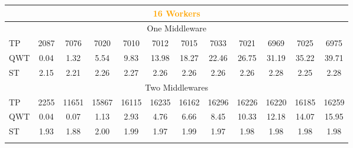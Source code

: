 \documentclass[11pt,a4paper]{article}
\let\tb\textbf
\begin{document}
\begin{table}[H]
\begin{center}
{{\begin{tabular}{|l||c|c|c|c|c|c|c|c|c|c|c|}
        \multicolumn{12}{|c|}{\textcolor{Orange}{\tb{16 Workers}}}        \\ \hline
        \multicolumn{12}{|c|}{One Middleware} \\ \hline
        TP       &      2087   &     7076 &       7020   &     7010  &      7012  &      7015    &    7033    &    7021     &   6969    &    7025    &    6975 \\ \hline
        QWT       &     0.04     &   1.32    &    5.54     &   9.83    &   13.98     &  18.27     &  22.46     &  26.75   &    31.19    &   35.22     &  39.71 \\ \hline
        ST       &      2.15   &     2.21   &     2.26   &     2.27   &     2.26    &    2.26   &     2.26     &   2.26    &    2.28    &    2.25   &     2.28 \\ \hline
        \multicolumn{12}{|c|}{Two Middlewares} \\ \hline
        TP       &      2255    &   11651    &   15867    &   16115  &     16235   &    16162  &     16296  &     16226   &    16220    &   16185    &   16259 \\ \hline
        QWT      &      0.04    &    0.07    &    1.13    &    2.93  &      4.76   &     6.66  &      8.45   &    10.33   &    12.18    &   14.07    &   15.95 \\ \hline
        ST       &      1.93    &    1.88     &   2.00    &    1.99  &      1.97   &     1.99  &      1.97  &      1.98  &      1.98    &    1.98    &    1.98 \\ \Xhline{4\arrayrulewidth}
        

\end{tabular}}}
\end{center}
\end{table}
\end{document}

